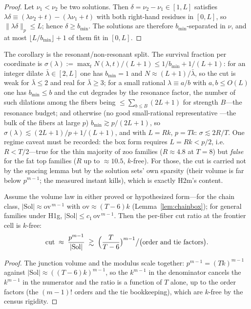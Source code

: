 \begin{proof}
Let $\nu_1<\nu_2$ be two solutions. Then
$\delta=\nu_2-\nu_1\in[1,L]$ satisfies
$\lambda\delta\equiv(\lambda\nu_2+t)-(\lambda\nu_1+t)$ with both
right-hand residues in $[0,L]$, so $\|\lambda\delta\|_p\le L$; hence
$\delta\ge b_{\min}$. The solutions are therefore $b_{\min}$-separated
in $\nu$, and at most $\lfloor L/b_{\min}\rfloor+1$ of them fit in
$[0,L]$.
\end{proof}

The corollary is the resonant/non-resonant split. The survival fraction
per coordinate is
$\sigma(\lambda):=\max_t N(\lambda,t)/(L+1)\le 1/b_{\min}+1/(L+1)$:
for an integer dilate $\bar\lambda\in[2,L]$ one has $b_{\min}=1$ and
$N\approx(L+1)/\bar\lambda$, so the cut is weak for $\bar\lambda\le 2$
and real for $\bar\lambda\ge 3$; for a small rational
$\lambda\equiv a/b$ with $a,b\le O(L)$ one has $b_{\min}\le b$ and the
cut degrades by the resonance factor, the number of such dilations among
the fibers being $\le\sum_{b\le B}(2L+1)$ for strength $B$---the
resonance budget; and otherwise (no good small-rational representative
---the bulk of the fibers at large $p$) $b_{\min}\gtrsim p/(2L+1)$, so
$\sigma(\lambda)\lesssim(2L+1)/p+1/(L+1)$, and with $L=Rk$, $p=Tk$:
$\sigma\lesssim 2R/T$. One regime caveat must be recorded: the box form
requires $L=Rk<p/2$, i.e.\ $R<T/2$---true for the thin majority of zoo
families ($R\approx4.8$ at $T=8$) but \emph{false} for the fat top
families ($R$ up to $\approx10.5$, $k$-free). For those, the cut is
carried not by the spacing lemma but by the solution sets' own sparsity
(their volume is far below $p^{m-1}$; the measured instant kills),
which is exactly H2m's content.

\begin{proposition}[$k$-cancellation]\label{prop:kcanc}
Assume the volume law in either proved or hypothesized form---for the
chain class, $|\mathrm{Sol}|\approx\mathrm{ov}^{\,m-1}$ with
$\mathrm{ov}\approx(T-6)k$ (Lemma~\ref{lem:chainbox}); for general
families under H1g, $|\mathrm{Sol}|\le c_1\,\mathrm{ov}^{\,m-1}$. Then
the per-fiber cut ratio at the frontier cell is $k$-free:
\[
\mathrm{cut}\;\approx\;\frac{p^{m-1}}{|\mathrm{Sol}|}
\;\gtrsim\;\Bigl(\frac{T}{T-6}\bigr)^{m-1}\big/\bigl(\text{order and
tie factors}\bigr).
\]
\end{proposition}

\begin{proof}
The junction volume and the modulus scale together:
$p^{m-1}=(Tk)^{m-1}$ against $|\mathrm{Sol}|\approx((T-6)k)^{m-1}$,
so the $k^{m-1}$ in the denominator cancels the $k^{m-1}$ in the
numerator and the ratio is a function of $T$ alone, up to the order
factors (the $(m-1)!$ orders and the tie bookkeeping), which are
$k$-free by the census rigidity.
\end{proof}

